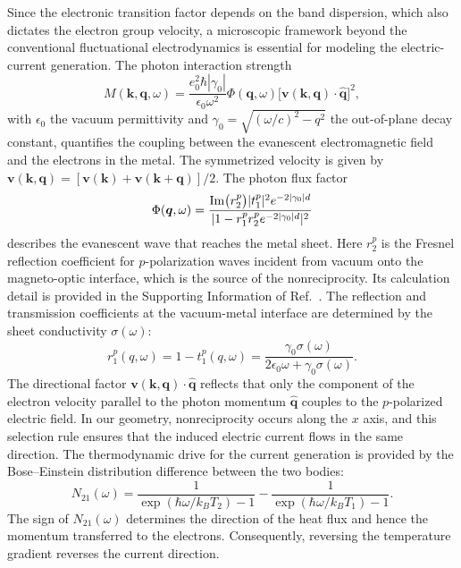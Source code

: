\documentclass[aps,prl,twocolumn,longbibliography]{revtex4-2}
\begin{document}
Since the electronic transition factor depends on the band dispersion, which also dictates
the electron group velocity, a microscopic framework beyond the conventional fluctuational
electrodynamics is essential for modeling the electric-current generation.
The photon interaction strength
\begin{equation} \label{M}
  M(\bm{k},\bm{q}, \omega) = \frac{e_0^2 \hbar |\gamma_0|}{\epsilon_0 \omega^2}
  \Phi(\bm{q}, \omega) \big[ \bm{v}(\bm{k},\bm{q}) \cdot \hat{\bm{q}} \big]^2 ,
\end{equation}
with $\epsilon_0$ the vacuum permittivity and $\gamma_0 = \sqrt{(\omega/c)^2-q^2}$ the
out-of-plane decay constant, quantifies the coupling between the evanescent
electromagnetic field and the electrons in the metal.
The symmetrized velocity is given by $\bm{v}(\bm{k},\bm{q}) = [ \bm{v}(\bm{k})
+ \bm{v}(\bm{k} + \bm{q})] /
2$.
The photon flux factor
\begin{equation}
  \Phi(\bm{q}, \omega) = \frac{{\rm Im}\big( r_2^p \big) |t_1^p|^2 e^{-2 |\gamma_0|
  d}}{|1 - r_1^p r_2^p e^{-2 |\gamma_0| d}|^2}
\end{equation}
describes the evanescent wave that reaches the metal sheet.
Here $r_2^p$ is the Fresnel reflection coefficient for $p$-polarization waves incident from
vacuum onto the magneto-optic interface, which is the source of the nonreciprocity. Its
calculation detail is provided in the Supporting Information of Ref.~\cite{GT_WSM}.
The reflection and transmission coefficients at the vacuum-metal interface are determined
by the sheet conductivity $\sigma(\omega)$:
\begin{equation} \label{r1p}
  r^p_1(q, \omega) = 1- t^p_1(q, \omega)
  = \frac{\gamma_0\sigma( \omega)}{2\epsilon_0\omega + \gamma_0\sigma( \omega)} .
\end{equation}
The directional factor $\bm{v}(\bm{k},\bm{q}) \cdot \hat{\bm{q}}$ reflects
that only the component of the electron velocity parallel to the photon momentum
$\hat{\bm{q}}$ couples to the $p$-polarized electric field. In our geometry,
nonreciprocity occurs along the $x$ axis, and this selection rule ensures that the induced
electric current flows in the same direction. The thermodynamic drive for the current
generation is provided by the Bose–Einstein distribution difference between the two
bodies:
\begin{equation} \label{N21}
  N_{21}(\omega) = \frac{1}{\exp(\hbar\omega/k_B T_2)-1} -
  \frac{1}{\exp(\hbar\omega/k_B T_1)-1} .
\end{equation}
The sign of $N_{21}(\omega)$ determines the direction of the heat flux and hence the
momentum transferred to the electrons. Consequently, reversing the temperature gradient
reverses the current direction.
\end{document}
